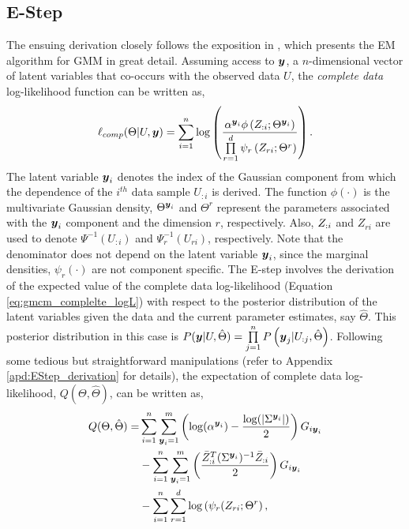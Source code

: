 \documentclass{article}
\theoremstyle{plain}
\theoremstyle{definition}
\theoremstyle{remark}
\begin{document}
\subsection{E-Step} \label{subsec:EStep}
The ensuing derivation closely follows the exposition in \citet{Bilmes98agentle}, which presents the EM algorithm for GMM in great detail. Assuming access to $\boldsymbol{y}$, a $n$-dimensional vector of latent variables that co-occurs with the observed data $U$, the \emph{complete data} log-likelihood function can be written as,
\begin{equation}\label{eq:gmcm_complelte_logL}
\ell_{comp}(\Theta |U,\boldsymbol{y})= \sum\limits_{i=1}^{n} \log \left( \frac{\alpha^{\boldsymbol{y}_i}\phi \left(Z_{:i};\Theta^{\boldsymbol{y}_i} \right)}{\prod\limits_{r=1}^{d}\psi_{r}\left(Z_{r{i}};\Theta^r \right)} \right) .
\end{equation}
The latent variable $\boldsymbol{y}_i$ denotes the index of the Gaussian component from which the dependence of the $i^{th}$ data sample $U_{:i}$ is derived. The function $\phi(\cdot)$ is the multivariate Gaussian density,  $\Theta^{\boldsymbol{y}_i}$ and $\Theta^r$ represent the parameters associated with the $\boldsymbol{y}_i$ component and the dimension $r$, respectively. Also, $Z_{:i}$ and $Z_{ri}$ are used to denote $\Psi^{-1}\left(U_{:i}\right)$ and $ \Psi_r^{-1}(U_{ri})$, respectively. Note that the denominator does not depend on the latent variable $\boldsymbol{y}_i$, since the marginal densities, $\psi_r(\cdot)$ are not component specific. The E-step involves the derivation of the expected value of the complete data log-likelihood (Equation \ref{eq:gmcm_complelte_logL}) with respect to the posterior distribution of the latent variables given the data and the current parameter estimates, say $\hat{\Theta}$. This posterior distribution in this case is $P(\boldsymbol{y}|U,\hat{\Theta}) = \prod\limits_{j=1}^{n}P\left(\boldsymbol{y}_j|U_{:j},\hat{\Theta} \right)$. Following some tedious but straightforward manipulations (refer to Appendix \ref{apd:EStep_derivation} for details), the expectation of complete data log-likelihood, $Q(\Theta,\hat{\Theta})$, can be written as,
\begin{align}\label{eq:GEM_objective}
Q(\Theta,\hat{\Theta}) =&  \sum\limits_{i=1}^n \sum\limits_{\boldsymbol{y}_i=1}^m  \left( \log (\alpha^{\boldsymbol{y}_i}) - \frac{\log(|\Sigma^{\boldsymbol{y}_i}|)}{2}\right) G_{i\boldsymbol{y}_i}  \nonumber \\ 
& -\sum\limits_{i=1}^n \sum\limits_{\boldsymbol{y}_i=1}^m  \left( \frac{\bar{Z}_{:{i}}^T(\Sigma^{\boldsymbol{y}_i})^{-1}\bar{Z}_{:{i}}}{2} \right) G_{i\boldsymbol{y}_i}  \nonumber \\
& -\sum\limits_{i=1}^n \sum\limits_{r=1}^{d} \log \left(\psi_r(Z_{ri};\Theta^r \right) ,
\end{align}
\end{document}
